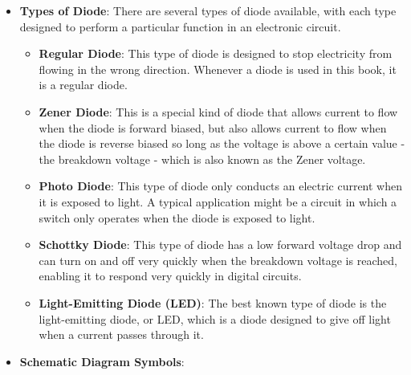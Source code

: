 \documentclass{report}
\begin{document}
\begin{itemize}
        \item \textbf{Types of Diode}: There are several types of diode available, with each type designed to perform a particular function in an electronic circuit.
            \begin{itemize}
                \item \textbf{Regular Diode}: This type of diode is designed to stop electricity from flowing in the wrong direction. Whenever a diode is used in this book, it is a regular diode.
                \item \textbf{Zener Diode}: This is a special kind of diode that allows current to flow when the diode is forward biased, but also allows current to flow when the diode is reverse biased so long as the voltage is above a certain value - the breakdown voltage - which is also known as the Zener voltage.
                \item \textbf{Photo Diode}: This type of diode only conducts an electric current when it is exposed to light. A typical application might be a circuit in which a switch only operates when the diode is exposed to light.
                \item \textbf{Schottky Diode}: This type of diode has a low forward voltage drop and can turn on and off very quickly when the breakdown voltage is reached, enabling it to respond very quickly in digital circuits.
                \item \textbf{Light-Emitting Diode (LED)}: The best known type of diode is the light-emitting diode, or LED, which is a diode designed to give off light when a current passes through it.
            \end{itemize}
        \item \textbf{Schematic Diagram Symbols}: 
            \bigbreak \noindent 


    \end{itemize}
\end{document}
